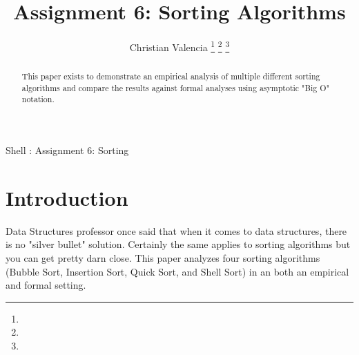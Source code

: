 \documentclass[journal]{IEEEtran}
\begin{document}
\title{Assignment 6: Sorting Algorithms}
\author{Christian Valencia
\thanks{}%
\thanks{}%
\thanks{}}

%
{Shell \MakeLowercase{\textit{}}: Assignment 6: Sorting}

\maketitle

\begin{abstract}
This paper exists to demonstrate an empirical analysis of multiple different sorting algorithms and compare the results against formal analyses using asymptotic "Big O" notation.
\end{abstract}

\IEEEpeerreviewmaketitle

\section{Introduction}

 Data Structures professor once said that when it comes to data structures, there is no "silver bullet" solution. Certainly the same applies to sorting algorithms but you can get pretty darn close. This paper analyzes four sorting algorithms (Bubble Sort, Insertion Sort, Quick Sort, and Shell Sort) in an both an empirical and formal setting.
\end{document}
